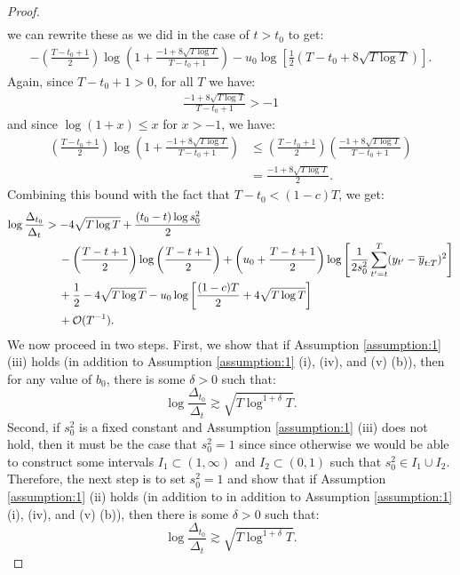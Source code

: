 \documentclass{article}
\begin{document}
\begin{proof}
\begin{align*}
\end{align*}
we can rewrite these as we did in the case of $t > t_0$ to get:
\begin{align*}
    - \left(\frac{T - t_0 + 1}{2}\right)\log\left(1 + \frac{-1 + 8\sqrt{T \log T}}{T-t_0+1}\right) - u_0\log\left[\frac{1}{2}(T-t_0 +8\sqrt{T \log T})\right].
\end{align*}
Again, since $T- t_0 + 1 > 0$, for all $T$ we have:
\begin{align*}
    \frac{-1 + 8\sqrt{T \log T}}{T-t_0+1} > -1
\end{align*}
and since $\log(1+x) \leq x$ for $x > -1$, we have:
\begin{align*}
    \left(\frac{T - t_0 + 1}{2}\right)\log\left(1 + \frac{-1 + 8\sqrt{T \log T}}{T-t_0+1}\right)  &\leq \left(\frac{T - t_0 + 1}{2}\right) \left(\frac{-1 + 8\sqrt{T \log T}}{T-t_0+1}\right) \\
    &= \frac{-1 + 8\sqrt{T \log T}}{2}.
\end{align*}
Combining this bound with the fact that $T-t_0 < (1-c)T$, we get:
\begin{align}
    \log \frac{\Delta_{t_0}}{\Delta_t} &> -4\sqrt{T \log T} + \frac{(t_0 - t)\log s_0^2}{2} \notag \\
    &\quad\: - \left(\frac{T - t + 1}{2}\right) \log\left(\frac{T-t+1}{2}\right) + \left(u_0 + \frac{T - t +1}{2}\right)\log\left[ \frac{1}{2s_0^2}\sum_{t'=t}^T (y_{t'} - \overline{y}_{t:T})^2 \right] \notag \\
    &\quad\: + \frac{1}{2} - 4 \sqrt{T \log T} - u_0\log\left[\frac{(1-c)T}{2} + 4\sqrt{T\log T}\right] \notag \\
    &\quad\: +  \mathcal{O}(T^{-1}) \label{eq:thm3-cs2-bd4}. 
\end{align}
We now proceed in two steps. First, we show that if Assumption \ref{assumption:1} (iii) holds (in addition to Assumption \ref{assumption:1} (i), (iv), and (v) (b)), then for any value of $b_0$, there is some $\delta > 0$ such that: $$\log \frac{\Delta_{t_0}}{\Delta_t} \gtrsim \sqrt{T\log^{1+\delta} T}.$$ Second, if $s_0^2$ is a fixed constant and Assumption \ref{assumption:1} (iii) does not hold, then it must be the case that $s_0^2 = 1$ since since otherwise we would be able to construct some intervals $I_1\subset(1,\infty)$ and $I_2\subset(0,1)$ such that $s_0^2 \in I_1\cup I_2$. Therefore, the next step is to set $s_0^2 = 1$ and show that if Assumption \ref{assumption:1} (ii) holds (in addition to in addition to Assumption \ref{assumption:1} (i), (iv), and (v) (b)), then there is some $\delta > 0$ such that: $$\log \frac{\Delta_{t_0}}{\Delta_t} \gtrsim \sqrt{T\log^{1+\delta} T}.$$


\end{proof}
\end{document}
